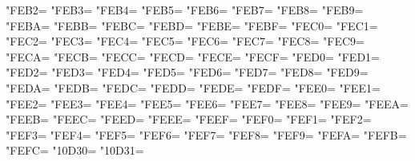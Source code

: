 \XeTeXcharclass"FEB2=\KclassArabU
\XeTeXcharclass"FEB3=\KclassArabU
\XeTeXcharclass"FEB4=\KclassArabU
\XeTeXcharclass"FEB5=\KclassArabU
\XeTeXcharclass"FEB6=\KclassArabU
\XeTeXcharclass"FEB7=\KclassArabU
\XeTeXcharclass"FEB8=\KclassArabU
\XeTeXcharclass"FEB9=\KclassArabU
\XeTeXcharclass"FEBA=\KclassArabU
\XeTeXcharclass"FEBB=\KclassArabU
\XeTeXcharclass"FEBC=\KclassArabU
\XeTeXcharclass"FEBD=\KclassArabU
\XeTeXcharclass"FEBE=\KclassArabU
\XeTeXcharclass"FEBF=\KclassArabU
\XeTeXcharclass"FEC0=\KclassArabU
\XeTeXcharclass"FEC1=\KclassArabU
\XeTeXcharclass"FEC2=\KclassArabU
\XeTeXcharclass"FEC3=\KclassArabU
\XeTeXcharclass"FEC4=\KclassArabU
\XeTeXcharclass"FEC5=\KclassArabU
\XeTeXcharclass"FEC6=\KclassArabU
\XeTeXcharclass"FEC7=\KclassArabU
\XeTeXcharclass"FEC8=\KclassArabU
\XeTeXcharclass"FEC9=\KclassArabU
\XeTeXcharclass"FECA=\KclassArabU
\XeTeXcharclass"FECB=\KclassArabU
\XeTeXcharclass"FECC=\KclassArabU
\XeTeXcharclass"FECD=\KclassArabU
\XeTeXcharclass"FECE=\KclassArabU
\XeTeXcharclass"FECF=\KclassArabU
\XeTeXcharclass"FED0=\KclassArabU
\XeTeXcharclass"FED1=\KclassArabU
\XeTeXcharclass"FED2=\KclassArabU
\XeTeXcharclass"FED3=\KclassArabU
\XeTeXcharclass"FED4=\KclassArabU
\XeTeXcharclass"FED5=\KclassArabU
\XeTeXcharclass"FED6=\KclassArabU
\XeTeXcharclass"FED7=\KclassArabU
\XeTeXcharclass"FED8=\KclassArabU
\XeTeXcharclass"FED9=\KclassArabU
\XeTeXcharclass"FEDA=\KclassArabU
\XeTeXcharclass"FEDB=\KclassArabU
\XeTeXcharclass"FEDC=\KclassArabU
\XeTeXcharclass"FEDD=\KclassArabU
\XeTeXcharclass"FEDE=\KclassArabU
\XeTeXcharclass"FEDF=\KclassArabU
\XeTeXcharclass"FEE0=\KclassArabU
\XeTeXcharclass"FEE1=\KclassArabU
\XeTeXcharclass"FEE2=\KclassArabU
\XeTeXcharclass"FEE3=\KclassArabU
\XeTeXcharclass"FEE4=\KclassArabU
\XeTeXcharclass"FEE5=\KclassArabU
\XeTeXcharclass"FEE6=\KclassArabU
\XeTeXcharclass"FEE7=\KclassArabU
\XeTeXcharclass"FEE8=\KclassArabU
\XeTeXcharclass"FEE9=\KclassArabU
\XeTeXcharclass"FEEA=\KclassArabU
\XeTeXcharclass"FEEB=\KclassArabU
\XeTeXcharclass"FEEC=\KclassArabU
\XeTeXcharclass"FEED=\KclassArabU
\XeTeXcharclass"FEEE=\KclassArabU
\XeTeXcharclass"FEEF=\KclassArabU
\XeTeXcharclass"FEF0=\KclassArabU
\XeTeXcharclass"FEF1=\KclassArabU
\XeTeXcharclass"FEF2=\KclassArabU
\XeTeXcharclass"FEF3=\KclassArabU
\XeTeXcharclass"FEF4=\KclassArabU
\XeTeXcharclass"FEF5=\KclassArabU
\XeTeXcharclass"FEF6=\KclassArabU
\XeTeXcharclass"FEF7=\KclassArabU
\XeTeXcharclass"FEF8=\KclassArabU
\XeTeXcharclass"FEF9=\KclassArabU
\XeTeXcharclass"FEFA=\KclassArabU
\XeTeXcharclass"FEFB=\KclassArabU
\XeTeXcharclass"FEFC=\KclassArabU
\XeTeXcharclass"10D30=\KclassArabU
\XeTeXcharclass"10D31=\KclassArabU
